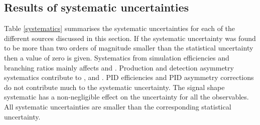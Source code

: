 \subsection{Results of systematic uncertainties}

Table \ref{systematics} summarises the systematic uncertainties for each of the different sources discussed in this section. If the systematic uncertainty was found to be more than two orders of magnitude smaller than the statistical uncertainty then a value of zero is given. Systematics from simulation efficiencies and branching ratios mainly affects \Rkk and \Rpipi. Production and detection asymmetry systematics contribute to \Akpi, \Akk and \Apipi. PID efficiencies and PID asymmetry corrections do not contribute much to the systematic uncertainty. The signal shape systematic has a non-negligible effect on the uncertainty for all the \CP observables. All systematic uncertainties are smaller than the corresponding statistical uncertainty. 

